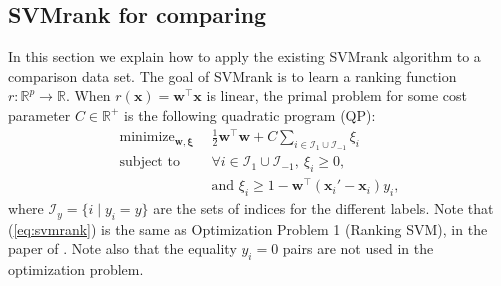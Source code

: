 \documentclass{article}
\newcommand{\RR}{\mathbb R}
\DeclareMathOperator*{\minimize}{minimize}
\begin{document}
\subsection{SVMrank for comparing}
\label{sec:svmrank}
In this section we explain how to apply the existing SVMrank algorithm
to a comparison data set.  The goal of SVMrank is to learn a ranking
function $r:\RR^p \rightarrow \RR$. When $r(\mathbf x)=\mathbf
w^\intercal \mathbf x$ is linear, the primal problem for some cost
parameter $C\in\RR^+$ is the following quadratic program (QP):
\begin{equation}
  \begin{aligned}
    \minimize_{\mathbf w, \mathbf \xi}\ \ & \frac 1 2
    \mathbf w^\intercal \mathbf w
    + C \sum_{i\in \mathcal I_1\cup \mathcal I_{-1}} \xi_i \\
    \text{subject to}\ \ &
    \forall i\in \mathcal I_1\cup \mathcal I_{-1},\ \xi_i \geq 0,\\
    & \text{and }\xi_i \geq 1-\mathbf w^\intercal(\mathbf x_i'-\mathbf
    x_i)y_i,
  \end{aligned}
  \label{eq:svmrank}
\end{equation}
where $\mathcal I_y=\{i\mid y_i=y\}$ are the sets of indices for the different
labels. Note that (\ref{eq:svmrank}) is the same as Optimization
Problem 1 (Ranking SVM), in the paper of \citet{ranksvm}. Note also
that the equality $y_i=0$ pairs are not used in the optimization
problem.
\end{document}
